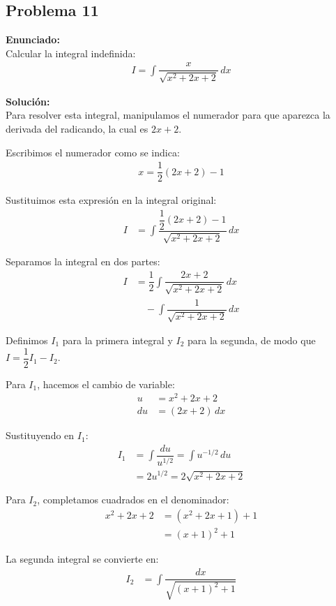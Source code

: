 \subsection*{Problema 11}

\textbf{Enunciado:} \\
Calcular la integral indefinida:
\begin{align*}
I = \int \dfrac{x}{\sqrt{x^2 + 2x + 2}} \, dx
\end{align*}

\textbf{Solución:} \\
Para resolver esta integral, manipulamos el numerador para que aparezca la derivada del radicando, la cual es $2x + 2$. 

Escribimos el numerador como se indica:
\begin{align*}
x = \dfrac{1}{2}(2x + 2) - 1
\end{align*}

Sustituimos esta expresión en la integral original:
\begin{align*}
I &= \int \dfrac{\dfrac{1}{2}(2x + 2) - 1}{\sqrt{x^2 + 2x + 2}} \, dx
\end{align*}

Separamos la integral en dos partes:
\begin{align*}
I &= \dfrac{1}{2} \int \dfrac{2x + 2}{\sqrt{x^2 + 2x + 2}} \, dx \\
&\quad - \int \dfrac{1}{\sqrt{x^2 + 2x + 2}} \, dx
\end{align*}

Definimos $I_1$ para la primera integral y $I_2$ para la segunda, de modo que $I = \dfrac{1}{2}I_1 - I_2$.

Para $I_1$, hacemos el cambio de variable:
\begin{align*}
u &= x^2 + 2x + 2 \\
du &= (2x + 2) \, dx
\end{align*}

Sustituyendo en $I_1$:
\begin{align*}
I_1 &= \int \dfrac{du}{u^{1/2}} = \int u^{-1/2} \, du \\
&= 2u^{1/2} = 2\sqrt{x^2 + 2x + 2}
\end{align*}

Para $I_2$, completamos cuadrados en el denominador:
\begin{align*}
x^2 + 2x + 2 &= (x^2 + 2x + 1) + 1 \\
&= (x + 1)^2 + 1
\end{align*}

La segunda integral se convierte en:
\begin{align*}
I_2 &= \int \dfrac{dx}{\sqrt{(x+1)^2 + 1}}
\end{align*}

